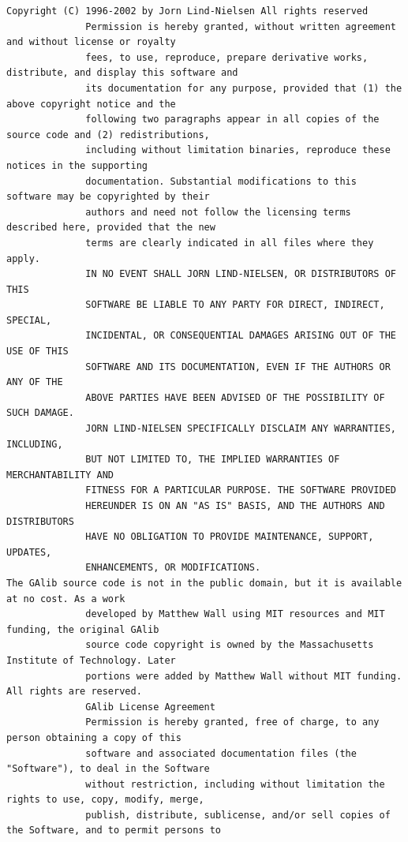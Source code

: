 \begin{lstlisting}[basicstyle=\ttfamily\scriptsize,breaklines=true]
Copyright (C) 1996-2002 by Jorn Lind-Nielsen All rights reserved
              Permission is hereby granted, without written agreement and without license or royalty
              fees, to use, reproduce, prepare derivative works, distribute, and display this software and
              its documentation for any purpose, provided that (1) the above copyright notice and the
              following two paragraphs appear in all copies of the source code and (2) redistributions,
              including without limitation binaries, reproduce these notices in the supporting
              documentation. Substantial modifications to this software may be copyrighted by their
              authors and need not follow the licensing terms described here, provided that the new
              terms are clearly indicated in all files where they apply.
              IN NO EVENT SHALL JORN LIND-NIELSEN, OR DISTRIBUTORS OF THIS
              SOFTWARE BE LIABLE TO ANY PARTY FOR DIRECT, INDIRECT, SPECIAL,
              INCIDENTAL, OR CONSEQUENTIAL DAMAGES ARISING OUT OF THE USE OF THIS
              SOFTWARE AND ITS DOCUMENTATION, EVEN IF THE AUTHORS OR ANY OF THE
              ABOVE PARTIES HAVE BEEN ADVISED OF THE POSSIBILITY OF SUCH DAMAGE.
              JORN LIND-NIELSEN SPECIFICALLY DISCLAIM ANY WARRANTIES, INCLUDING,
              BUT NOT LIMITED TO, THE IMPLIED WARRANTIES OF MERCHANTABILITY AND
              FITNESS FOR A PARTICULAR PURPOSE. THE SOFTWARE PROVIDED
              HEREUNDER IS ON AN "AS IS" BASIS, AND THE AUTHORS AND DISTRIBUTORS
              HAVE NO OBLIGATION TO PROVIDE MAINTENANCE, SUPPORT, UPDATES,
              ENHANCEMENTS, OR MODIFICATIONS.
The GAlib source code is not in the public domain, but it is available at no cost. As a work
              developed by Matthew Wall using MIT resources and MIT funding, the original GAlib
              source code copyright is owned by the Massachusetts Institute of Technology. Later
              portions were added by Matthew Wall without MIT funding. All rights are reserved.
              GAlib License Agreement
              Permission is hereby granted, free of charge, to any person obtaining a copy of this
              software and associated documentation files (the "Software"), to deal in the Software
              without restriction, including without limitation the rights to use, copy, modify, merge,
              publish, distribute, sublicense, and/or sell copies of the Software, and to permit persons to

\end{lstlisting}

